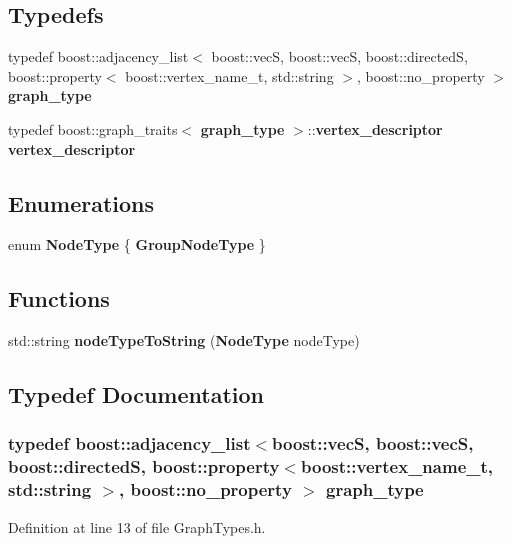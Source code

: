 \subsection*{Typedefs}
\begin{CompactItemize}
\item 
typedef boost::adjacency\_\-list$<$ boost::vecS, boost::vecS, boost::directedS, boost::property$<$ boost::vertex\_\-name\_\-t, std::string $>$, boost::no\_\-property $>$ {\bf graph\_\-type}
\item 
typedef boost::graph\_\-traits$<$ {\bf graph\_\-type} $>$::{\bf vertex\_\-descriptor} {\bf vertex\_\-descriptor}
\end{CompactItemize}
\subsection*{Enumerations}
\begin{CompactItemize}
\item 
enum {\bf NodeType} \{ {\bf GroupNodeType}
 \}
\end{CompactItemize}
\subsection*{Functions}
\begin{CompactItemize}
\item 
std::string {\bf nodeTypeToString} ({\bf NodeType} nodeType)
\end{CompactItemize}


\subsection{Typedef Documentation}
\subsubsection{\setlength{\rightskip}{0pt plus 5cm}typedef boost::adjacency\_\-list$<$boost::vecS, boost::vecS, boost::directedS, boost::property$<$boost::vertex\_\-name\_\-t, std::string $>$, boost::no\_\-property $>$ {\bf graph\_\-type}}\label{GraphTypes_8h_dda532105e3fe044cd87d00a26f4977d}




Definition at line 13 of file GraphTypes.h.
